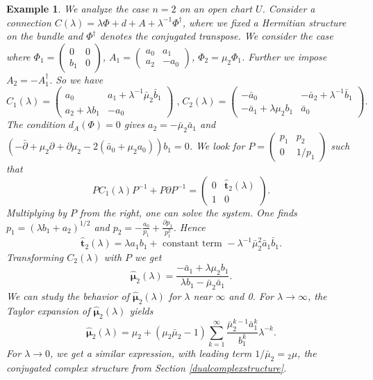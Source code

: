 \documentclass[11pt]{amsart}
\newtheorem{example}[thm]{Example}
\numberwithin{thm}{section} %
\numberwithin{equation}{section} %
\numberwithin{figure}{section} %
\renewcommand*{\l}{\lambda}
\begin{document}
\begin{example}\label{examplen2}
We analyze the case $n=2$ on an open chart $U$. Consider a connection $C(\l)=\l\Phi+d+A+\l^{-1}\Phi^\dagger$, where we fixed a Hermitian structure on the bundle and $\Phi^\dagger$ denotes the conjugated transpose. We consider the case where $\Phi_1 = \left(\begin{smallmatrix} 0 & 0 \\ b_1 & 0\end{smallmatrix}\right)$, $A_1 = \left(\begin{smallmatrix} a_0 & a_1 \\ a_2 & -a_0\end{smallmatrix}\right)$, $\Phi_2=\mu_2\Phi_1$. Further we impose $A_2 = -A_1^{\dagger}$. So we have 
$$C_1(\l)=\begin{pmatrix} a_0 & a_1+\l^{-1}\bar{\mu}_2\bar{b}_1 \\ a_2+\l b_1 & -a_0\end{pmatrix}\; \text{,} \; C_2(\l)=\begin{pmatrix} -\bar{a}_0 & -\bar{a}_2+\l^{-1}\bar{b}_1 \\ -\bar{a}_1+\l\mu_2b_1 & \bar{a}_0\end{pmatrix}.$$
The condition $d_A(\Phi)=0$ gives $a_2=-\bar{\mu}_2\bar{a}_1$ and $(-\bar\partial+\mu_2\partial+\partial\mu_2-2(\bar{a}_0+\mu_2a_0))b_1=0$.
We look for $P=\left(\begin{smallmatrix} p_1 & p_2 \\ 0 & 1/p_1\end{smallmatrix}\right)$ such that 
$$P C_1(\l)P^{-1}+ P\partial P^{-1} = \begin{pmatrix} 0 & \bm\hat{t}_2(\l) \\ 1 & 0\end{pmatrix}.$$
Multiplying by $P$ from the right, one can solve the system. One finds $p_1=(\l b_1+a_2)^{1/2}$ and $p_2=-\frac{a_0}{p_1}+\frac{\partial p_1}{p_1^2}$. Hence 
$$\bm\hat{t}_2(\l)=\l a_1b_1+ \text{ constant term }-\l^{-1}\bar{\mu}_2^2 \bar{a}_1\bar{b}_1.$$ Transforming $C_2(\l)$ with $P$ we get 
$$\bm\hat{\mu}_2(\l) = \frac{-\bar{a}_1+\l\mu_2 b_1}{\l b_1-\bar{\mu}_2\bar{a}_1}.$$
We can study the behavior of $\bm\hat{\mu}_2(\l)$ for $\l$ near $\infty$ and 0. For $\l\rightarrow \infty$, the Taylor expansion of $\bm\hat{\mu}_2(\l)$ yields
$$\bm\hat{\mu}_2(\l)=\mu_2+(\mu_2\bar{\mu}_2-1)\sum_{k=1}^\infty \frac{\bar{\mu}_2^{k-1}\bar{a}_1^k}{b_1^k}\l^{-k}.$$
For $\l \rightarrow 0$, we get a similar expression, with leading term $1/\bar{\mu}_2={}_2\mu$, the conjugated complex structure from Section \ref{dualcomplexstructure}.
\end{example}
\end{document}
